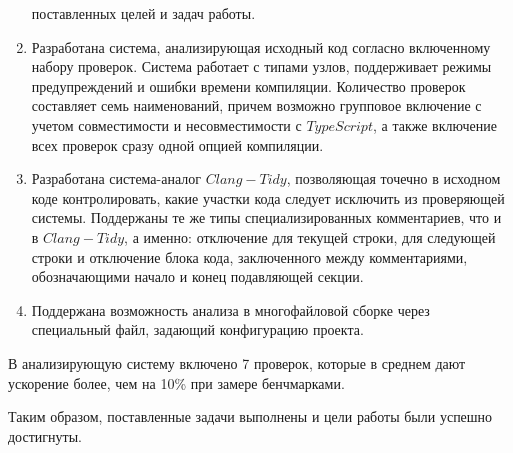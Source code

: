 \documentclass{mipt-thesis-bs}
\begin{document}
\begin{enumerate}
    поставленных целей и задач работы.
    \item Разработана система, анализирующая исходный код согласно включенному набору проверок. Система работает
    с типами узлов, поддерживает режимы предупреждений и ошибки времени компиляции. Количество проверок составляет
    семь наименований, причем возможно групповое включение с учетом совместимости и несовместимости с
    $TypeScript$, а также включение всех проверок сразу одной опцией компиляции.
    \item Разработана система-аналог $Clang-Tidy$, позволяющая точечно в исходном коде контролировать,
    какие участки кода следует исключить из проверяющей системы. Поддержаны те же типы специализированных
    комментариев, что и в $Clang-Tidy$, а именно: отключение для текущей строки, для следующей строки и отключение
    блока кода, заключенного между комментариями, обозначающими начало и конец подавляющей секции.
    \item Поддержана возможность анализа в многофайловой сборке через специальный файл, задающий
    конфигурацию проекта.
\end{enumerate}

В анализирующую систему включено 7 проверок, которые в среднем дают ускорение более, чем на 10\%
при замере бенчмарками.

Таким образом, поставленные задачи выполнены и цели работы были успешно
достигнуты.

\backmatter
\end{document}
